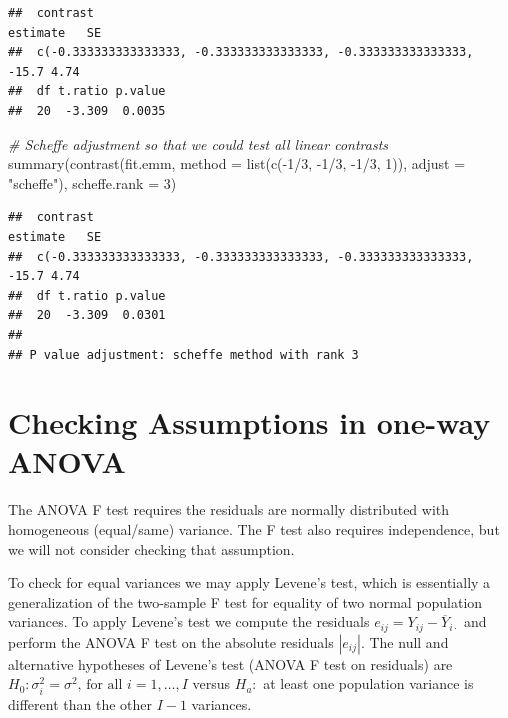 \documentclass[
]{book}
\newenvironment{Shaded}{\begin{snugshade}}{\end{snugshade}}
\newcommand{\AttributeTok}[1]{\textcolor[rgb]{0.77,0.63,0.00}{#1}}
\newcommand{\CommentTok}[1]{\textcolor[rgb]{0.56,0.35,0.01}{\textit{#1}}}
\newcommand{\DecValTok}[1]{\textcolor[rgb]{0.00,0.00,0.81}{#1}}
\newcommand{\FunctionTok}[1]{\textcolor[rgb]{0.00,0.00,0.00}{#1}}
\newcommand{\NormalTok}[1]{#1}
\newcommand{\SpecialCharTok}[1]{\textcolor[rgb]{0.00,0.00,0.00}{#1}}
\newcommand{\StringTok}[1]{\textcolor[rgb]{0.31,0.60,0.02}{#1}}
\begin{document}
\begin{verbatim}
##  contrast                                                       estimate   SE
##  c(-0.333333333333333, -0.333333333333333, -0.333333333333333,     -15.7 4.74
##  df t.ratio p.value
##  20  -3.309  0.0035
\end{verbatim}

\begin{Shaded}
\begin{Highlighting}[]
\CommentTok{\# Scheffe adjustment so that we could test all linear contrasts}
\FunctionTok{summary}\NormalTok{(}\FunctionTok{contrast}\NormalTok{(fit.emm, }\AttributeTok{method =} \FunctionTok{list}\NormalTok{(}\FunctionTok{c}\NormalTok{(}\SpecialCharTok{{-}}\DecValTok{1}\SpecialCharTok{/}\DecValTok{3}\NormalTok{, }\SpecialCharTok{{-}}\DecValTok{1}\SpecialCharTok{/}\DecValTok{3}\NormalTok{, }\SpecialCharTok{{-}}\DecValTok{1}\SpecialCharTok{/}\DecValTok{3}\NormalTok{, }\DecValTok{1}\NormalTok{)), }
                 \AttributeTok{adjust =} \StringTok{"scheffe"}\NormalTok{), }\AttributeTok{scheffe.rank =} \DecValTok{3}\NormalTok{)}
\end{Highlighting}
\end{Shaded}

\begin{verbatim}
##  contrast                                                       estimate   SE
##  c(-0.333333333333333, -0.333333333333333, -0.333333333333333,     -15.7 4.74
##  df t.ratio p.value
##  20  -3.309  0.0301
## 
## P value adjustment: scheffe method with rank 3
\end{verbatim}

\hypertarget{checking-assumptions-in-one-way-anova}{%
\section{Checking Assumptions in one-way ANOVA}\label{checking-assumptions-in-one-way-anova}}

The ANOVA F test requires the residuals are normally distributed with homogeneous (equal/same) variance. The F test also requires independence, but we will not consider checking that assumption.

To check for equal variances we may apply Levene's test, which is essentially a generalization of the two-sample F test for equality of two normal population variances. To apply Levene's test we compute the residuals \(e_{ij} = Y_{ij} - \overline Y_{i\cdot}\) and perform the ANOVA F test on the absolute residuals \(|e_{ij}|\). The null and alternative hypotheses of Levene's test (ANOVA F test on residuals) are \(H_0:\sigma_i^2 = \sigma^2, \, \text{for all }i=1, \ldots, I\) versus \(H_a:\) at least one population variance is different than the other \(I-1\) variances.
\end{document}
